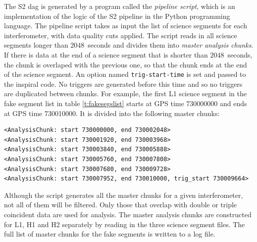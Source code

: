 The S2 dag is generated by a program called the \emph{pipeline script}, which
is an implementation of the logic of the S2 pipeline in the Python programming
language. The pipeline script takes as input the list of science segments for
each interferometer, with data quality cuts applied. The script reads in all
science segments longer than $2048$~seconds and divides them into \emph{master
analysis chunks}. If there is data at the end of a science segment that is
shorter than $2048$~seconds, the chunk is overlaped with the previous one, so
that the chunk ends at the end of the science segment. An option named
\verb|trig-start-time| is set and passed to the inspiral code. No triggers are
generated before this time and so no triggers are duplicated between chunks.
For example, the first L1 science segment in the fake segment list in table
\ref{t:fakesegslist} starts at GPS time 730000000 and ends at GPS time
730010000. It is divided into the following master chunks:
\begin{verbatim}
<AnalysisChunk: start 730000000, end 730002048>
<AnalysisChunk: start 730001920, end 730003968> 
<AnalysisChunk: start 730003840, end 730005888> 
<AnalysisChunk: start 730005760, end 730007808> 
<AnalysisChunk: start 730007680, end 730009728> 
<AnalysisChunk: start 730007952, end 730010000, trig_start 730009664>
\end{verbatim}
Although the script generates all the master chunks for a given
interferometer, not all of them will be filtered. Only those that overlap with
double or triple coincident data are used for analysis.  The master analysis
chunks are constructed for L1, H1 and H2 separately by reading in the three
science segment files. The full list of master chunks for the fake segments is
written to a log file.

